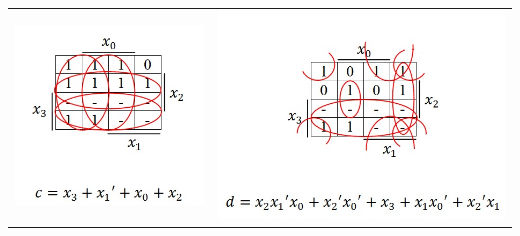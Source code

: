 \documentclass{article}
\begin{document}
\begin{table}[h!]
\begin{tabular}{ c c }
\centering
\includegraphics[scale=0.6]{c-KMap} &
\includegraphics[scale=0.6]{d-KMap} \\
\end{tabular}
\end{table}
\end{document}
